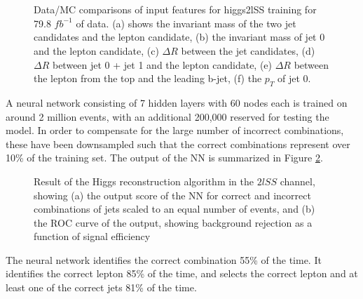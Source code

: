 \begin{figure}[H]
    \centering
    \\
    \\
    \caption{Data/MC comparisons of input features for higgs2lSS training for 79.8 $fb^{-1}$ of data. (a) shows the invariant mass of the two jet candidates and the lepton candidate, (b) the invariant mass of jet 0 and the lepton candidate, (c) $\Delta R$ between the jet candidates, (d) $\Delta R$ between jet 0 + jet 1 and the lepton candidate, (e) $\Delta R$ between the lepton from the top and the leading b-jet, (f) the $p_T$ of jet 0.}
    \label{fig:model_higgs2lSS}
\end{figure}

A neural network consisting of 7 hidden layers with 60 nodes each is trained on around 2 million events, with an additional 200,000 reserved for testing the model. In order to compensate for the large number of incorrect combinations, these have been downsampled such that the correct combinations represent over 10\% of the training set. The output of the NN is summarized in Figure \ref{fig:higgs2lSSresults}.

\begin{figure}[H]
    \centering
  \label{fig:higgs2lSSresults}
  \caption{Result of the Higgs reconstruction algorithm in the $2lSS$ channel, showing (a) the output score of the NN for correct and incorrect combinations of jets scaled to an equal number of events, and (b) the ROC curve of the output, showing background rejection as a function of signal efficiency}
\end{figure} 

The neural network identifies the correct combination 55\% of the time. It identifies the correct lepton 85\% of the time, and selects the correct lepton and at least one of the correct jets 81\% of the time.

